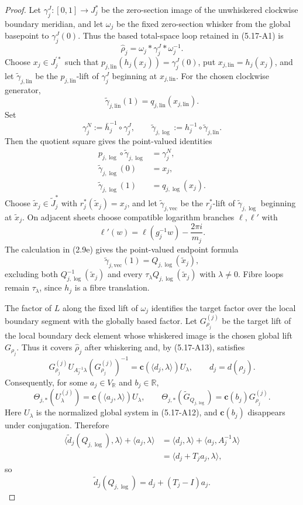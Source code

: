 \begin{proof}
Let \(\gamma_j^J:[0,1]\to J_j^*\) be the zero-section image of the
unwhiskered clockwise boundary meridian, and let \(\omega_j\) be the fixed
zero-section whisker from the global basepoint to \(\gamma_j^J(0)\).  Thus
the based total-space loop retained in (5.17-A1) is
\[
 \widehat\rho_j=\omega_j*\gamma_j^J*\omega_j^{-1}.
\]
Choose \(x_j\in J_j^{\prime *}\) such that
\(p_{j,\mathrm{lin}}(h_j(x_j))=\gamma_j^J(0)\), put
\(x_{j,\mathrm{lin}}=h_j(x_j)\), and let
\(\widetilde\gamma_{j,\mathrm{lin}}\) be the
\(p_{j,\mathrm{lin}}\)-lift of \(\gamma_j^J\) beginning at
\(x_{j,\mathrm{lin}}\).  For the chosen clockwise generator,
\[
 \widetilde\gamma_{j,\mathrm{lin}}(1)
 =q_{j,\mathrm{lin}}(x_{j,\mathrm{lin}}).
\]
Set
\[
 \gamma_j^N:=\bar h_j^{-1}\circ\gamma_j^J,
 \qquad
 \widetilde\gamma_{j,\log}
 :=h_j^{-1}\circ\widetilde\gamma_{j,\mathrm{lin}}.
\]
Then the quotient square gives the point-valued identities
\[
\begin{aligned}
 p_{j,\log}\circ\widetilde\gamma_{j,\log}
  &=\gamma_j^N,\\
 \widetilde\gamma_{j,\log}(0)&=x_j,\\
 \widetilde\gamma_{j,\log}(1)&=q_{j,\log}(x_j).
\end{aligned}
\]
Choose \(\widetilde x_j\in\widetilde J_j^*\) with
\(r_j^*(\widetilde x_j)=x_j\), and let
\(\widetilde\gamma_{j,\mathrm{vec}}\) be the \(r_j^*\)-lift of
\(\widetilde\gamma_{j,\log}\) beginning at \(\widetilde x_j\).  On
adjacent sheets choose compatible logarithm branches \(\ell,\ell'\) with
\[
 \ell'(w)=\ell(g_j^{-1}w)-\frac{2\pi i}{m_j}.
\]
The calculation in (2.9e) gives the point-valued endpoint formula
\[
 \widetilde\gamma_{j,\mathrm{vec}}(1)
 =Q_{j,\log}(\widetilde x_j),
\]
excluding both \(Q_{j,\log}^{-1}(\widetilde x_j)\) and every
\(\tau_\lambda Q_{j,\log}(\widetilde x_j)\) with \(\lambda\ne0\).
Fibre loops remain \(\tau_\lambda\), since \(h_j\) is a fibre translation.

The factor of \(L\) along the fixed lift of \(\omega_j\) identifies the
target factor over the local boundary segment with the globally based
factor.  Let \(G_{\rho_j}^{(j)}\) be the target lift of the local boundary
deck element whose whiskered image is the chosen global lift
\(G_{\rho_j}\).  Thus it covers \(\widehat\rho_j\) after whiskering and,
by (5.17-A13), satisfies
\[
 G_{\rho_j}^{(j)}U_{A_j^{-1}\lambda}(G_{\rho_j}^{(j)})^{-1}
 =\mathbf c(\langle d_j,\lambda\rangle)U_\lambda,
 \qquad d_j=d(\rho_j).
\]
Consequently, for some
\(a_j\in V_{\mathbb R}\) and \(b_j\in\mathbb R\),
\[
 \Theta_{j,*}(U_\lambda^{(j)})
 =\mathbf c(\langle a_j,\lambda\rangle)U_\lambda,
 \qquad
 \Theta_{j,*}(\widetilde G_{Q_{j,\log}})
 =\mathbf c(b_j)G_{\rho_j}^{(j)}.
\]
Here \(U_\lambda\) is the normalized global system in (5.17-A12), and
\(\mathbf c(b_j)\) disappears under conjugation.
Therefore
\[
\begin{aligned}
 \langle\widetilde d_j(Q_{j,\log}),\lambda\rangle
 +\langle a_j,\lambda\rangle
 &=\langle d_j,\lambda\rangle
   +\langle a_j,A_j^{-1}\lambda\rangle\\
 &=\langle d_j+T_ja_j,\lambda\rangle,
\end{aligned}
\]
so
\[
 \widetilde d_j(Q_{j,\log})=d_j+(T_j-I)a_j.
\tag{5.17-A14e}
\]


\end{proof}
